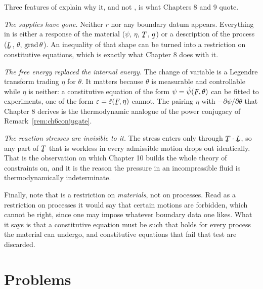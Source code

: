 \begin{remark}\label{rem:ch6cdread}
Three features of  explain why it, and not , is
what Chapters 8 and 9 quote.

\emph{The supplies have gone.} Neither $r$ nor any boundary datum
appears. Everything in  is either a response of the material
($\psi$, $\eta$, $\bT$, $\bq$) or a description of the process
($\bL$, $\theta$, $\operatorname{grad}\theta$). An inequality of that shape can be
turned into a restriction on constitutive equations, which is exactly
what Chapter 8 does with it.

\emph{The free energy replaced the internal energy.} The change of
variable  is a Legendre transform trading $\eta$ for
$\theta$. It matters because $\theta$ is measurable and controllable
while $\eta$ is neither: a constitutive equation of the form
$\psi=\hat\psi(\bF,\theta)$ can be fitted to experiments, one of the
form $\eps=\hat\eps(\bF,\eta)$ cannot. The pairing $\eta$ with
$-\partial\psi/\partial\theta$ that Chapter 8 derives is the
thermodynamic analogue of the power conjugacy of
Remark~\ref{rem:ch6conjugate}.

\emph{The reaction stresses are invisible to it.} The stress enters
 only through $\bT\cdot\bL$, so any part of $\bT$ that is
workless in every admissible motion drops out identically. That is the
observation on which Chapter 10 builds the
whole theory of constraints on, and it is the reason the pressure in an
incompressible fluid is thermodynamically indeterminate.

Finally, note that  is a restriction on \emph{materials},
not on processes. Read as a restriction on processes it would say that
certain motions are forbidden, which cannot be right, since one may
impose whatever boundary data one likes. What it says is that a
constitutive equation must be such that  holds for every
process the material can undergo, and constitutive equations that fail
that test are discarded.
\end{remark}


\setcounter{problemenv}{0}
\section{Problems}\label{sec:problems:c6}

